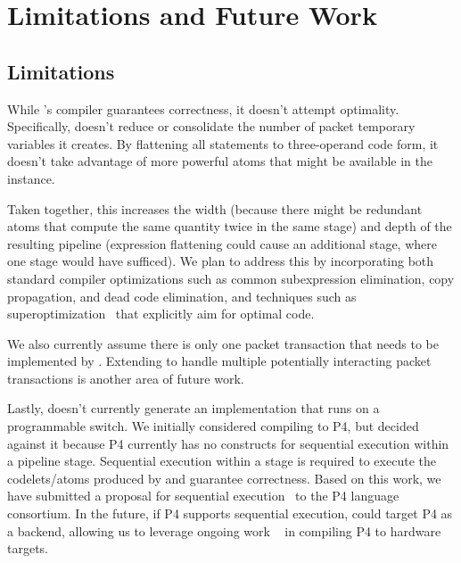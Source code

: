 \section{Limitations and Future Work}
\label{s:limitations}

\subsection{Limitations}
While \pktlanguage's compiler guarantees correctness, it doesn't attempt
optimality.  Specifically, \pktlanguage doesn't reduce or consolidate the
number of packet temporary variables it creates. By flattening all statements
to three-operand code form, it doesn't take advantage of more powerful atoms
that might be available in the \absmachine instance.

Taken together, this increases the width (because there might be redundant
atoms that compute the same quantity twice in the same stage) and depth of the
resulting pipeline (expression flattening could cause an additional stage,
where one stage would have sufficed). We plan to address this by incorporating
both standard compiler optimizations such as common subexpression elimination,
copy propagation, and dead code elimination, and techniques such as
superoptimization~\cite{stoke, superoptimizer} that explicitly aim for optimal
code.

We also currently assume there is only one packet transaction that needs to be
implemented by \pktlanguage. Extending \pktlanguage to handle multiple
potentially interacting packet transactions is another area of future work.

Lastly, \pktlanguage doesn't currently generate an implementation that runs on
a programmable switch. We initially considered compiling \pktlanguage to
P4, but decided against it because P4 currently has no constructs for
sequential execution within a pipeline stage. Sequential execution within a
stage is required to execute the codelets/atoms produced by \pktlanguage and
guarantee correctness. Based on this work, we have submitted a proposal for
sequential execution~\cite{p4-semantics} to the P4 language consortium. In the
future, if P4 supports sequential execution, \pktlanguage could target P4 as a
backend, allowing us to leverage ongoing work ~\cite{netronome,
xilinx,lavanya_compiler} in compiling P4 to hardware targets.

